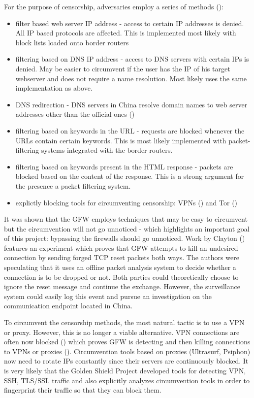\documentclass[11pt]{book} %
\begin{document}
For the purpose of censorship, adversaries employ a series of methods (\citep*{internetFilteringChina}):

\begin{itemize}
\item filter based web server IP address - access to certain IP addresses is denied. All IP based protocols are affected. This is implemented most likely with block lists loaded onto border routers
\item filtering based on DNS IP address - access to DNS servers with certain IPs is denied. May be easier to circumvent if the user has the IP of his target webserver and does not require a name resolution. Most likely uses the same implementation as above.
\item DNS redirection - DNS servers in China resolve domain names to web server addresses other than the official ones (\citep*{dnsWall})
\item filtering based on keywords in the URL - requests are blocked whenever the URLs contain certain keywords. This is most likely implemented with packet-filtering systems integrated with the border routers.
\item filtering based on keywords present in the HTML response - packets are blocked based on the content of the response. This is a strong argument for the presence a packet filtering system.
\item explictly blocking tools for circumventing censorship: VPNs (\citep*{web:guardianChinaFirewall}) and Tor (\citep*{winterInChina}) 
\end{itemize}


It was shown that the GFW employs techniques that may be easy to circumvent but the circumvention will not go unnoticed - which highlights an important goal of this project: bypassing the firewalls should go unnoticed. Work by Clayton (\citep*{ignoringChina}) features an experiment which proves that GFW attempts to kill an undesired connection by sending forged TCP reset packets both ways. The authors were speculating that it uses an offline packet analysis system to decide whether a connection is to be dropped or not. Both parties could theoretically choose to ignore the reset message and continue the exchange. However, the surveillance system could easily log this event and pursue an investigation on the communication endpoint located in China.

To circumvent the censorship methods, the most natural tactic is to use a VPN or proxy. However, this is no longer a viable alternative. VPN connections are often now blocked (\citep*{web:guardianChinaFirewall}) which proves GFW is detecting and then killing connections to VPNs or proxies (\citep*{hikingGFW}). Circumvention tools based on proxies (Ultrasurf, Psiphon) now need to rotate IPs constantly since their servers are continuously blocked. It is very likely that the Golden Shield Project developed tools for detecting VPN, SSH, TLS/SSL traffic and also explicitly analyzes circumvention tools in order to fingerprint their traffic so that they can block them.
\end{document}
